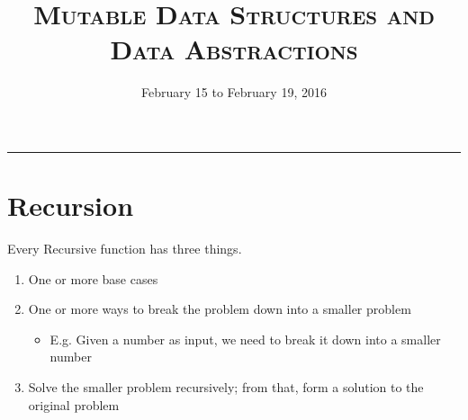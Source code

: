 \documentclass{exam}
\title{\textsc{Mutable Data Structures and Data Abstractions}}
\date{February 15 to February 19, 2016}
\begin{document}
\maketitle
\rule{\textwidth}{0.15em}
\fontsize{12}{15}\selectfont

\section{Recursion}

Every Recursive function has three things.
\begin{enumerate}
\item One or more base cases
\item One or more ways to break the problem down into a smaller problem
\begin{itemize}
\item E.g. Given a number as input, we need to break it down into a smaller number
\end{itemize}
\item Solve the smaller problem recursively; from that, form a solution to the original problem
\end{enumerate}
\end{document}
